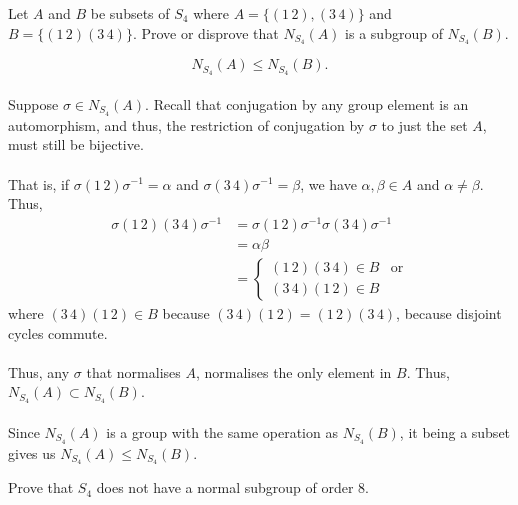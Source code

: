 \documentclass[12 pt, letterpaper]{hmcpset}
\begin{document}
\begin{problem}[1.]
	Let $A$ and $B$ be subsets of $S_{4}$ where $A = \{ (1 \, 2), (3 \, 4) \}$ and $B = \{ (1 \, 2)(3 \, 4) \}$. Prove or disprove that $N_{S_{4}}(A)$ is a subgroup of $N_{S_{4}}(B)$.
\end{problem}

\begin{solution}
	\[
		\boxed{
			N_{S_{4}}(A) \le N_{S_{4}}(B).
		}
	\] \\
	Suppose $\sigma \in N_{S_{4}}(A)$. Recall that conjugation by any group element is an automorphism, and thus, the restriction of conjugation by $\sigma$ to just the set $A$, must still be bijective. \\\\
	That is, if $\sigma (1 \, 2) \sigma^{-1} = \alpha$ and $\sigma (3 \, 4) \sigma^{-1} = \beta$, we have $\alpha, \beta \in A$ and $\alpha \neq \beta$. Thus,
	\[
		\begin{split}
			\sigma (1 \, 2) (3 \, 4) \sigma^{-1} & = \sigma (1 \, 2) \sigma^{-1} \sigma (3 \, 4) \sigma^{-1} \\
							     & = \alpha \beta \\
							     & = \begin{cases}
								     (1 \, 2) (3 \, 4) \in B & \text{or} \\
								     (3 \, 4) (1 \, 2) \in B
							     \end{cases}
		\end{split}
	\]
	where $(3 \, 4)(1 \, 2) \in B$ because $(3 \, 4)(1 \, 2) = (1 \, 2)(3 \, 4)$, because disjoint cycles commute. \\\\
	Thus, any $\sigma$ that normalises $A$, normalises the only element in $B$. Thus, $N_{S_{4}}(A) \subset N_{S_{4}}(B)$. \\\\
	Since $N_{S_{4}}(A)$ is a group with the same operation as $N_{S_{4}}(B)$, it being a subset gives us $N_{S_{4}}(A) \le N_{S_{4}}(B)$.
\end{solution}

\pagebreak

\begin{problem}[2.]
	Prove that $S_{4}$ does not have a normal subgroup of order $8$.
\end{problem}
\end{document}
